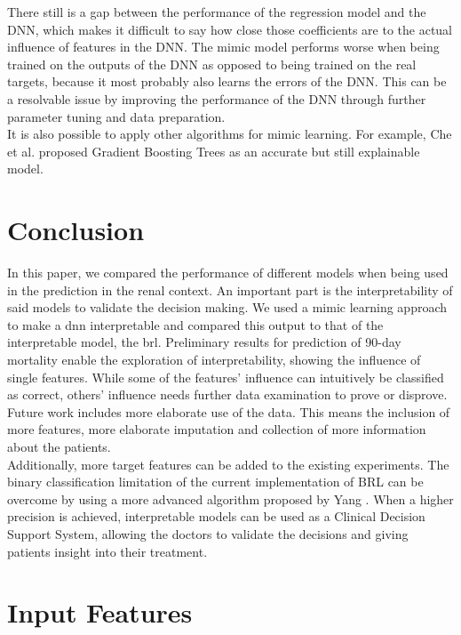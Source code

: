 \documentclass[conference,comsoc]{IEEEtran}
\begin{document}
There still is a gap between the performance of the regression model and the DNN, which makes it difficult to say how close those coefficients are to the actual influence of features in the DNN.
The mimic model performs worse when being trained on the outputs of the DNN as opposed to being trained on the real targets, because it most probably also learns the errors of the DNN.
This can be a resolvable issue by improving the performance of the DNN through further parameter tuning and data preparation. \\
It is also possible to apply other algorithms for mimic learning.
For example, Che et al. \cite{Che2016} proposed Gradient Boosting Trees as an accurate but still explainable model.


\section{Conclusion}
In this paper, we compared the performance of different models when being used in the prediction in the renal context.
An important part is the interpretability of said models to validate the decision making.
We used a mimic learning approach to make a \gls{dnn} interpretable and compared this output to that of the interpretable model, the \gls{brl}.
Preliminary results for prediction of 90-day mortality enable the exploration of interpretability, showing the influence of single features.
While some of the features' influence can intuitively be classified as correct, others' influence needs further data examination to prove or disprove. \\
Future work includes more elaborate use of the data. 
This means the inclusion of more features, more elaborate imputation and collection of more information about the patients. \\
Additionally, more target features can be added to the existing experiments. 
The binary classification limitation of the current implementation of BRL can be overcome by using a more advanced algorithm proposed by Yang \cite{Yang2016}.
When a higher precision is achieved, interpretable models can be used as a Clinical Decision Support System, allowing the doctors to validate the decisions and giving patients insight into their treatment.




\onecolumn

\appendices
\section{Input Features}
\label{app:input}
\end{document}
